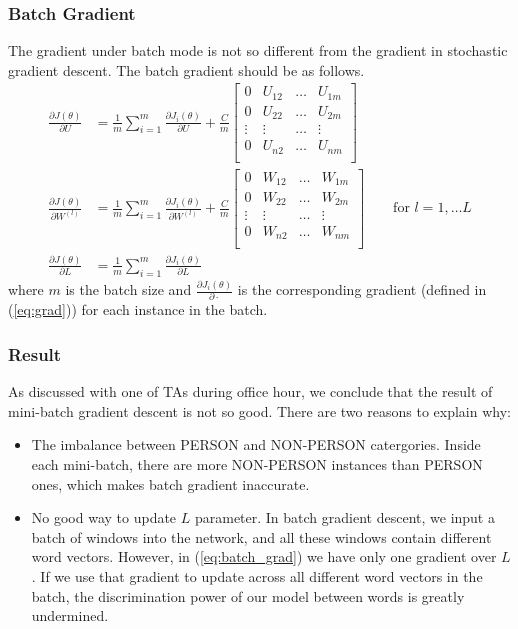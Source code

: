 \documentclass[letterpaper]{article}
\begin{document}
\subsubsection{Batch Gradient}
The gradient under batch mode is not so different from the gradient in stochastic gradient descent. The batch gradient should be as follows.
\begin{equation}\label{eq:batch_grad}
\begin{split}
\frac{\partial J(\theta)}{\partial U} &
= \frac{1}{m} \sum_{i=1}^m \frac{\partial J_i(\theta)}{\partial U}
+ \frac{C}{m}
\begin{bmatrix}
0 & U_{12} & \dots & U_{1m} \\
0 & U_{22} & \dots & U_{2m} \\
\vdots & \vdots & \dots & \vdots  \\
0 & U_{n2} & \dots & U_{nm} \\
\end{bmatrix} \\
\frac{\partial J(\theta)}{\partial W^{(l)}} &
= \frac{1}{m} \sum_{i=1}^m \frac{\partial J_i(\theta)}{\partial W^{(l)}}
+ \frac{C}{m}
\begin{bmatrix}
0 & W_{12} & \dots & W_{1m} \\
0 & W_{22} & \dots & W_{2m} \\
\vdots & \vdots & \dots & \vdots  \\
0 & W_{n2} & \dots & W_{nm} \\
\end{bmatrix}
\qquad \textrm{for } l = 1, \dots L \\
\frac{\partial J(\theta)}{\partial L}
&= \frac{1}{m} \sum_{i=1}^{m} \frac{\partial J_i(\theta)}{\partial L}
\end{split}
\end{equation}
where $m$ is the batch size and $\frac{\partial J_i(\theta)}{\partial \cdot}$ is the corresponding gradient (defined in (\ref{eq:grad})) for each instance in the batch.


\subsubsection{Result}
As discussed with one of TAs during office hour, we conclude that the result of mini-batch gradient descent is not so good. There are two reasons to explain why:
\begin{itemize}
\item The imbalance between PERSON and NON-PERSON catergories. Inside each mini-batch, there are more NON-PERSON instances than PERSON ones, which makes batch gradient inaccurate.
\item No good way to update $L$ parameter. In batch gradient descent, we input a batch of windows into the network, and all these windows contain different word vectors. However, in (\ref{eq:batch_grad}) we have only one gradient over $L$. If we use that gradient to update across all different word vectors in the batch, the discrimination power of our model between words is greatly undermined.
\end{itemize}
\end{document}
